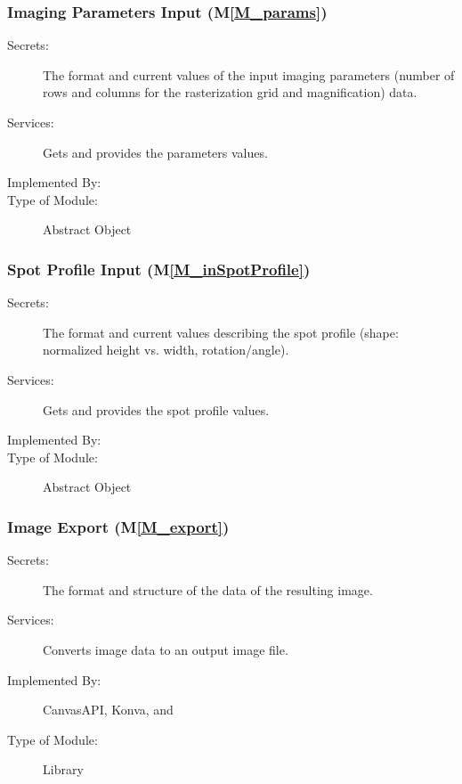 \documentclass[12pt, titlepage]{article}
\newcommand{\mref}[1]{M\ref{#1}}
\begin{document}
\subsubsection{Imaging Parameters Input (\mref{M_params})}
\begin{description}
\item[Secrets:] The format and current values of the input imaging parameters (number
  of rows and columns for the rasterization grid and magnification) data.
\item[Services:] Gets and provides the parameters values.
\item[Implemented By:] \progname{}
\item[Type of Module:] Abstract Object
\end{description}


\subsubsection{Spot Profile Input (\mref{M_inSpotProfile})}
\begin{description}
\item[Secrets:] The format and current values describing the spot profile
  (shape: normalized height vs. width, rotation/angle).
\item[Services:] Gets and provides the spot profile values.
\item[Implemented By:] \progname{}
\item[Type of Module:] Abstract Object
\end{description}


\subsubsection{Image Export (\mref{M_export})}
\begin{description}
\item[Secrets:] The format and structure of the data of the resulting image.
\item[Services:] Converts image data to an output image file.
\item[Implemented By:] CanvasAPI, Konva, and \progname{}
\item[Type of Module:] Library
\end{description}
\end{document}
